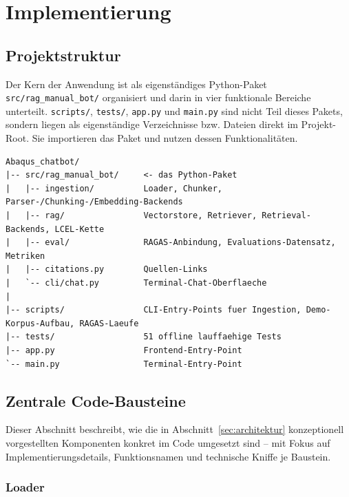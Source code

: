 \documentclass[11pt,a4paper]{article}
\begin{document}
\section{Implementierung}
\label{sec:code}

\subsection{Projektstruktur}

Der Kern der Anwendung ist als eigenständiges Python-Paket
\texttt{src/rag\_manual\_bot/} organisiert und darin in vier funktionale
Bereiche unterteilt. \texttt{scripts/}, \texttt{tests/}, \texttt{app.py}
und \texttt{main.py} sind nicht Teil dieses
Pakets, sondern liegen als eigenständige Verzeichnisse bzw. Dateien direkt
im Projekt-Root. Sie importieren das Paket und nutzen dessen Funktionalitäten.

\begin{lstlisting}[numbers=none, basicstyle=\ttfamily\scriptsize, frame=single, breaklines=true]
Abaqus_chatbot/
|-- src/rag_manual_bot/     <- das Python-Paket
|   |-- ingestion/          Loader, Chunker, Parser-/Chunking-/Embedding-Backends
|   |-- rag/                Vectorstore, Retriever, Retrieval-Backends, LCEL-Kette
|   |-- eval/               RAGAS-Anbindung, Evaluations-Datensatz, Metriken
|   |-- citations.py        Quellen-Links
|   `-- cli/chat.py         Terminal-Chat-Oberflaeche
|
|-- scripts/                CLI-Entry-Points fuer Ingestion, Demo-Korpus-Aufbau, RAGAS-Laeufe
|-- tests/                  51 offline lauffaehige Tests
|-- app.py                  Frontend-Entry-Point
`-- main.py                 Terminal-Entry-Point
\end{lstlisting}

\subsection{Zentrale Code-Bausteine}

Dieser Abschnitt beschreibt, wie die in Abschnitt~\ref{sec:architektur}
konzeptionell vorgestellten Komponenten konkret im Code umgesetzt sind --
mit Fokus auf Implementierungsdetails, Funktionsnamen und technische
Kniffe je Baustein.

\subsubsection{Loader}
\end{document}
